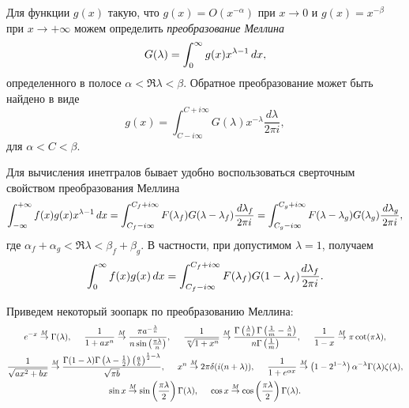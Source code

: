 

Для функции $g(x)$ такую, что $g(x) = O(x^{-\alpha})$ при $x \to 0$ и $g(x) = x^{-\beta}$ при $x \to + \infty$ можем определить
\textit{преобразование Меллина}
\begin{equation*}
	G(\lambda) = \int_{0}^{\infty} g(x) x^{\lambda-1} \, d x,
\end{equation*}
определенного в полосе $\alpha < \Re \lambda < \beta$. Обратное преобразование может быть найдено в виде
\begin{equation*}
	g(x) = \int_{C - i \infty}^{C + i \infty} G(\lambda) x^{-\lambda} \frac{d \lambda}{2 \pi i},
\end{equation*} 
для $\alpha  <C < \beta$. 

Для вычисления инетгралов бывает удобно воспользоваться сверточным свойством преобразования Меллина
\begin{equation*}
	\int_{-\infty}^{+\infty} f(x) g(x) x^{\lambda-1} \, d x = 
	\int_{C_f - i \infty}^{C_f + i \infty} F(\lambda_f) G(\lambda-\lambda_f) \frac{\, d \lambda_f}{2\pi i}  = \int_{C_g - i \infty}^{C_g + i \infty}  F(\lambda-\lambda_g)  G(\lambda_g) \frac{\, d \lambda_g}{2\pi i},
\end{equation*}
где $\alpha_f + \alpha_g < \Re \lambda < \beta_f + \beta_g$. 
В частности, при допустимом $\lambda = 1$, получаем
\begin{equation*}
	\int_{0}^{\infty} f(x) g(x) \, d x = 
	\int_{C_f - i \infty}^{C_f + i \infty} F(\lambda_f) G(1-\lambda_f) \frac{d \lambda_f}{2 \pi i}.
\end{equation*}

Приведем некоторый зоопарк по преобразованию Меллина:
\begin{gather*}
	e^{-x} \overset{M}{\to}  \Gamma(\lambda),
	\hspace{5 mm} 
	\frac{1}{1 + a x^n} \overset{M}{\to} \frac{\pi  a^{-\frac{\lambda }{n}}}{n \sin \left(\frac{\pi  \lambda }{n}\right)},
	\hspace{5 mm} 
	\frac{1}{\sqrt[m]{1 + x^n}} \overset{M}{\to}
	\frac{\Gamma \left(\frac{\lambda }{n}\right) \Gamma \left(\frac{1}{m}-\frac{\lambda }{n}\right)}{n \Gamma \left(\frac{1}{m}\right)}, 
	\hspace{5 mm} 
	\frac{1}{1-x}\overset{M}{\to}  \pi  \cot (\pi  \lambda ),
	\\
	\frac{1}{\sqrt{a x^2+b x}}
	\overset{M}{\to}
	\frac{\Gamma (1-\lambda ) \Gamma \left(\lambda -\frac{1}{2}\right) \left(\frac{a}{b}\right)^{\frac{1}{2}-\lambda }}{\sqrt{\pi b}},
	\hspace{5 mm} 
	x^n \overset{M}{\to} 2 \pi  \delta (i (n+\lambda )), 
	\hspace{5 mm} 
	\frac{1}{1 + e^{\alpha x}} \overset{M}{\to}  \left(1-2^{1-\lambda }\right) \alpha ^{-\lambda } \Gamma (\lambda ) \zeta (\lambda ),
	\\ 
	\sin x \overset{M}{\to} \sin \left(\frac{\pi  \lambda }{2}\right) \Gamma (\lambda )
	, \hspace{5 mm}  
	\cos x \overset{M}{\to} \cos \left(\frac{\pi  \lambda }{2}\right) \Gamma (\lambda ).
\end{gather*}